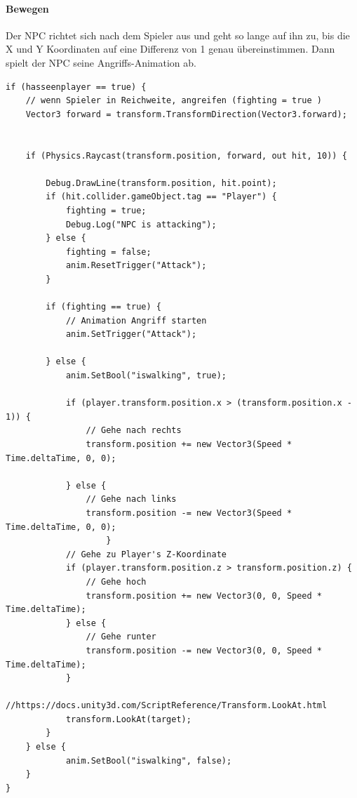 \paragraph{Bewegen }
Der NPC richtet sich nach dem Spieler aus und geht so lange auf ihn zu, bis die X und Y Koordinaten auf eine Differenz von 1 genau übereinstimmen.
Dann spielt der NPC seine Angriffs-Animation ab.
\begin{lstlisting}
if (hasseenplayer == true) {	
	// wenn Spieler in Reichweite, angreifen (fighting = true )
	Vector3 forward = transform.TransformDirection(Vector3.forward);

	
	if (Physics.Raycast(transform.position, forward, out hit, 10)) {	

		Debug.DrawLine(transform.position, hit.point);
		if (hit.collider.gameObject.tag == "Player") {
			fighting = true;
			Debug.Log("NPC is attacking");
		} else {
			fighting = false;
			anim.ResetTrigger("Attack");
		}

		if (fighting == true) {
			// Animation Angriff starten
			anim.SetTrigger("Attack");
			
		} else {	
			anim.SetBool("iswalking", true);
					
			if (player.transform.position.x > (transform.position.x - 1)) {
				// Gehe nach rechts
				transform.position += new Vector3(Speed * Time.deltaTime, 0, 0);
            		
			} else {
				// Gehe nach links
				transform.position -= new Vector3(Speed * Time.deltaTime, 0, 0);
					}
			// Gehe zu Player's Z-Koordinate
			if (player.transform.position.z > transform.position.z) {
				// Gehe hoch
				transform.position += new Vector3(0, 0, Speed * Time.deltaTime);
			} else {
				// Gehe runter
				transform.position -= new Vector3(0, 0, Speed * Time.deltaTime);
			}
			//https://docs.unity3d.com/ScriptReference/Transform.LookAt.html
			transform.LookAt(target);
		}
	} else {
			anim.SetBool("iswalking", false);
	}
}

\end{lstlisting}
